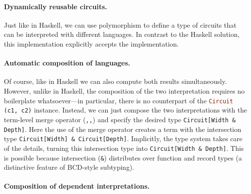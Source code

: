 \paragraph{Dynamically reusable circuits.}

Just like in Haskell, we can use polymorphism to define a type
of circuits that can be interpreted with different languages.
In contrast to the Haskell solution, this implementation explicitly accepts
the implementation.

\paragraph{Automatic composition of languages.}

Of course, like in Haskell we can also compute both results simultaneously.
However, unlike in Haskell, the composition of the two interpretation requires
no boilerplate whatsoever---in particular, there is no \sedel counterpart of the
\lstinline[language=haskell]{Circuit (c1, c2)} instance. Instead, we can just compose the two interpretations
with the term-level merge operator (\lstinline{,,}) and specify the desired type \lstinline{Circuit[Width & Depth]}.
Here the use of the merge operator creates a term with the intersection type
\lstinline{Circuit[Width] & Circuit[Depth]}. Implicitly, the \sedel type system
takes care of the details, turning this intersection type into
\lstinline{Circuit[Width & Depth]}. This is possible because intersection (\lstinline{&}) distributes over function and record types (a distinctive feature of BCD-style subtyping).

\paragraph{Composition of dependent interpretations.}

